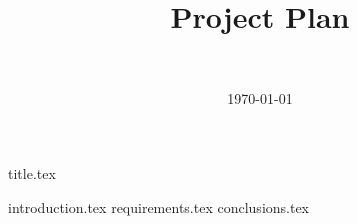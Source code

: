 \documentclass[final]{report}
\title{Project Plan}
\author{~}
\date{\today}
\begin{document}

{title.tex}
\newpage
\tableofcontents

\newpage
{}
{introduction.tex}
{requirements.tex}
{conclusions.tex}
\newpage
{}

\end{document}
